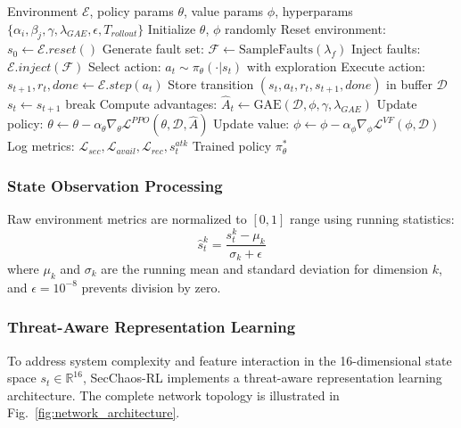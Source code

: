 \documentclass[pdflatex,sn-mathphys-num]{sn-jnl}%
\theoremstyle{thmstyleone}%
\theoremstyle{thmstyletwo}%
\theoremstyle{thmstylethree}%
\begin{document}
\begin{algorithm}[!t]
	\small
	\caption{SecChaos-RL Training Algorithm}
	\label{alg:secchaos_rl}
	\begin{algorithmic}[1]
		\Require Environment $\mathcal{E}$, policy params $\theta$, value params $\phi$, hyperparams $\{\alpha_i, \beta_j, \gamma, \lambda_{GAE}, \epsilon, T_{rollout}\}$
		\State Initialize $\theta$, $\phi$ randomly
		\State Reset environment: $s_0 \leftarrow \mathcal{E}.reset()$
		\State Generate fault set: $\mathcal{F} \leftarrow \text{SampleFaults}(\lambda_f)$
		\State Inject faults: $\mathcal{E}.inject(\mathcal{F})$
		\State Select action: $a_t \sim \pi_\theta(\cdot|s_t)$ with exploration
		\State Execute action: $s_{t+1}, r_t, done \leftarrow \mathcal{E}.step(a_t)$
		\State Store transition $(s_t, a_t, r_t, s_{t+1}, done)$ in buffer $\mathcal{D}$
		\State $s_t \leftarrow s_{t+1}$
		\State break
		\EndIf
		\EndFor
		\State Compute advantages: $\hat{A}_t \leftarrow \text{GAE}(\mathcal{D}, \phi, \gamma, \lambda_{GAE})$
		\State Update policy: $\theta \leftarrow \theta - \alpha_\theta \nabla_\theta \mathcal{L}^{PPO}(\theta, \mathcal{D}, \hat{A})$
		\State Update value: $\phi \leftarrow \phi - \alpha_\phi \nabla_\phi \mathcal{L}^{VF}(\phi, \mathcal{D})$
		\State Log metrics: $\mathcal{L}_{sec}, \mathcal{L}_{avail}, \mathcal{L}_{rec}, s_t^{atk}$
		\EndFor
		\Return Trained policy $\pi_\theta^*$
	\end{algorithmic}
\end{algorithm}
	\subsubsection{State Observation Processing}
	
	Raw environment metrics are normalized to $[0, 1]$ range using running statistics:
	\begin{equation}
		\hat{s}_t^{k} = \frac{s_t^{k} - \mu_k}{\sigma_k + \epsilon}
	\end{equation}
	where $\mu_k$ and $\sigma_k$ are the running mean and standard deviation for dimension $k$, and $\epsilon = 10^{-8}$ prevents division by zero.
	
	\subsubsection{Threat-Aware Representation Learning}
	
	To address system complexity and feature interaction in the 16-dimensional state space $s_t \in \mathbb{R}^{16}$, SecChaos-RL implements a threat-aware representation learning architecture. The complete network topology is illustrated in Fig.~\ref{fig:network_architecture}.
	
\end{document}
